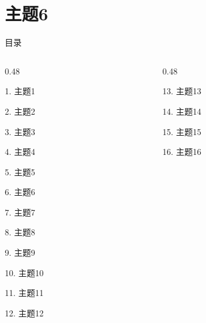 \documentclass[aspectratio=169,10pt,fontset=fandol]{ctexbeamer}
\begin{document}
\section{主题6}
\begin{frame}[t,fragile]{目录}
\small
\begin{columns}[T,onlytextwidth]
\begin{column}{0.48\textwidth}
{\color{black}\small 1. 主题1\par}\vspace{0.22em}
{\color{black}\small 2. 主题2\par}\vspace{0.22em}
{\color{black}\small 3. 主题3\par}\vspace{0.22em}
{\color{black}\small 4. 主题4\par}\vspace{0.22em}
{\color{black}\small 5. 主题5\par}\vspace{0.22em}
{\color{blue}\small 6. 主题6\par}\vspace{0.22em}
{\color{gray!40}\small 7. 主题7\par}\vspace{0.22em}
{\color{gray!40}\small 8. 主题8\par}\vspace{0.22em}
{\color{gray!40}\small 9. 主题9\par}\vspace{0.22em}
{\color{gray!40}\small 10. 主题10\par}\vspace{0.22em}
{\color{gray!40}\small 11. 主题11\par}\vspace{0.22em}
{\color{gray!40}\small 12. 主题12\par}\vspace{0.22em}
\end{column}
\begin{column}{0.48\textwidth}
{\color{gray!40}\small 13. 主题13\par}\vspace{0.22em}
{\color{gray!40}\small 14. 主题14\par}\vspace{0.22em}
{\color{gray!40}\small 15. 主题15\par}\vspace{0.22em}
{\color{gray!40}\small 16. 主题16\par}\vspace{0.22em}

\end{column}
\end{columns}
\end{frame}
\end{document}
